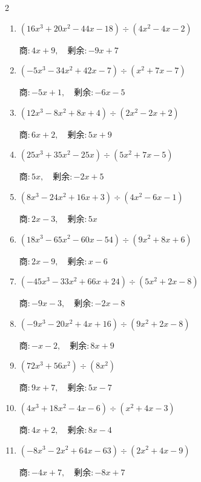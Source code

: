 \begin{multicols}{2}
\begin{enumerate}
        $商 : 6x, \quad 剰余 : x$

\columnbreak %

  \item $(16x^{3}+20x^{2}-44x-18) \div (4x^{2}-4x-2)$

        $商 : 4x+9, \quad 剰余 : -9x+7$

  \item $(-5x^{3}-34x^{2}+42x-7) \div (x^{2}+7x-7)$

        $商 : -5x+1, \quad 剰余 : -6x-5$

  \item $(12x^{3}-8x^{2}+8x+4) \div (2x^{2}-2x+2)$

        $商 : 6x+2, \quad 剰余 : 5x+9$

  \item $(25x^{3}+35x^{2}-25x) \div (5x^{2}+7x-5)$

        $商 : 5x, \quad 剰余 : -2x+5$

  \item $(8x^{3}-24x^{2}+16x+3) \div (4x^{2}-6x-1)$

        $商 : 2x-3, \quad 剰余 : 5x$

\columnbreak %

\resetques

  \item $(18x^{3}-65x^{2}-60x-54) \div (9x^{2}+8x+6)$

        $商 : 2x-9, \quad 剰余 : x-6$

  \item $(-45x^{3}-33x^{2}+66x+24) \div (5x^{2}+2x-8)$

        $商 : -9x-3, \quad 剰余 : -2x-8$

  \item $(-9x^{3}-20x^{2}+4x+16) \div (9x^{2}+2x-8)$

        $商 : -x-2, \quad 剰余 : 8x+9$

  \item $(72x^{3}+56x^{2}) \div (8x^{2})$

        $商 : 9x+7, \quad 剰余 : 5x-7$

  \item $(4x^{3}+18x^{2}-4x-6) \div (x^{2}+4x-3)$

        $商 : 4x+2, \quad 剰余 : 8x-4$

\columnbreak %

  \item $(-8x^{3}-2x^{2}+64x-63) \div (2x^{2}+4x-9)$

        $商 : -4x+7, \quad 剰余 : -8x+7$


\end{enumerate}
\end{multicols}
